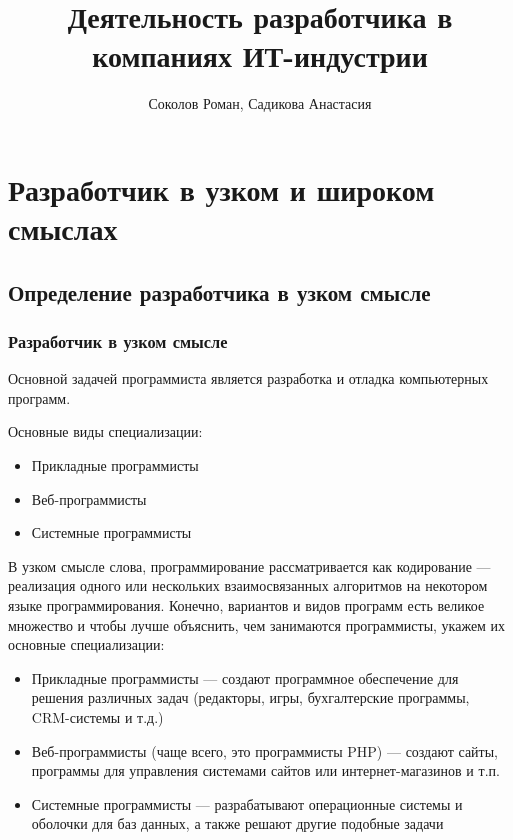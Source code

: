 \documentclass{../industrial-development}
\title{Деятельность разработчика в компаниях ИТ-индустрии}
\author{Соколов Роман, Садикова Анастасия}
\date{}
\begin{document}
\begin{frame}
  \titlepage
\end{frame}


\section{Разработчик в узком и широком смыслах}
\subsection{Определение разработчика в узком смысле}
\begin{frame} \frametitle{Разработчик в узком смысле}
Основной задачей программиста является разработка и отладка компьютерных программ.	
\vspace{\baselineskip}

Основные виды специализации:
 \begin{itemize}
	\item Прикладные программисты
	\item Веб-программисты
	\item Системные программисты
 \end{itemize}
\end{frame}
\lecturenotes
В узком смысле слова, программирование рассматривается как кодирование --- реализация одного или нескольких взаимосвязанных алгоритмов на некотором языке программирования. Конечно, вариантов и видов программ есть великое множество и чтобы лучше объяснить, чем занимаются программисты, укажем их основные специализации:\\
\begin{itemize}
	\item Прикладные программисты — создают программное обеспечение для решения различных задач (редакторы, игры, бухгалтерские программы, CRM-системы и т.д.)
	\item Веб-программисты (чаще всего, это программисты PHP) — создают сайты, программы для управления системами сайтов или интернет-магазинов и т.п.
	\item Системные программисты — разрабатывают операционные системы и оболочки для баз данных, а также решают другие подобные задачи
\end{itemize}
\end{document}
